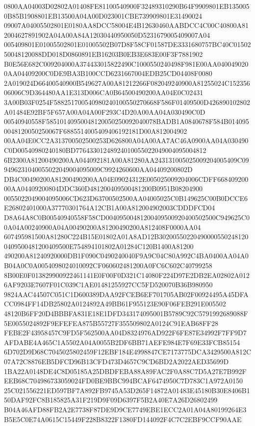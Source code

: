 \documentclass[UTF8,fontset=fandol,zihao=-4,a4paper]{ctexart}
\begin{document}
{{0800AA04003D02802A01408FE81100540900F32489310290B64F9909801EB1350050B85B1908801EB13500A04A00D023001CBE739909801E31490024
09007A04005502801E0180AA8DCC58004E4B12630460AABDCC4C00C40800A812004627891902A04A00A84A12030440950050D5231679005409007A04
005409801E01005502801E01005502B07D8F58CF01587DE3331680757BC40C0150250048120088DD018D0860891EB16203B0EB3E683E00F3F7881902
B0E56E682C009204000A374433015822490C1000550240498F981E00AA0400490200AA04409200C0DE9BA3B100CCD6231667004EDB25CD04408F0080
2A019024D66400540900B549627A00A81212266F082049240900A81255024C15235606006C9D364480AA1E313D006CA0B64500490200AA04E0C02431
3A00B03F0254F588251700540980240100550270668F586F01409500D426890102802A01484E92BF5F657A00A04A00F293C4D20A00AA04A030490C0D
00540940558F58510140950048120050250092040078BADB1A0840678F584B0140950048120050250067F6885514005409406192181D00A812004902
00AA04E0CC2A313700502500253D626800A04A00AA7AC46A0900AA04A030490C0D00540980240180BD77643301248924010055022049004095004812
6B2300A81200490200AA044092181A00A81280AA243131005025009204005409C099496231040055022049004095009C9924260600AA04409200802D
DB4C00490200A81200490200AA04E09024312E005025009204006CDFF66840920000AA04409200804DDC360D481200409500481200B0951B08204900
0055022049004095006CD623D63700502500AA04005025C0B149625C00B0DCCE6E26802401000A37770301764A12CB1A00A812004902003CDDDFCD04
D8A64A8C0B00540940558F58CD00409500481200409500920400502500C949625C00A04A00240900A04A00490200A81200490200A812408F0000AA04
607495981500A81280C224B15E01802A01A8AD12B302005502204900005502481200409500481200409500E754894101802A01284C120B1400A81200
490200A81240920000DB1F090C0490240040F9A9C04C80A992C4BA0400AA04A0B04A0C0A0054098024010092CF060602481200A0FC6C602C40799258
8B00E0F013829900922461141E0F00F0D321C14080F224D97E2DB2EA02802A0126AF9203E7607F01C039C1AE01481255927CC5FD520070B36B980950
9824AAC44507C051C1D600389DAA92FCEB6EF701705AB02F00924495A45DFACC0984FF14DB25802A0124892A49BB61F955123E90F06FEB291E005502
48120B6FF20D4BBBFA831E18E1DFD343174095001B5789C92C5791992689088F5E0055024892F9EFEFEA875B55727F355509802A0124C91EAB68FF28
FEBE2F43958457C9FD5F562500AA04D8324976AD922F6FE87E34992F7FF9D7AFDABE4A465C1A5502A04A0055B2DF6BB71AEFE984E7F69E33FCB85154
6D702D9D68C7045025802459F12EBF184E4998847CE7173775DCA3429500A812C07A72C8876EB5DFCD96B13CFD473D4657C9CD6BD2A2022AED35699D
1BA22A0148DE4C8D05185A25DBDFEBA88A89FAC2F0A88C7D5A27E7B992FEEB68C704986733059024FD0BE9BBC994BCAF6474950C7D783C1A972A0150
25C021556221ED597BF7A892FB9745A53D265F14872A01483E45180B30E8406B150DAF92FC8B185825A31F219D9F09D6397F5B2A40E7A26D26802499
B04A46AFD88FB2A2E7738F87DE9D9CE7749EBE1ECC2A01A04A80199264E3B5E5C0E74A0615C15449F228B8322F1380FD144092F4C7C2EBF9CCF90AAE
}}
\end{document}
